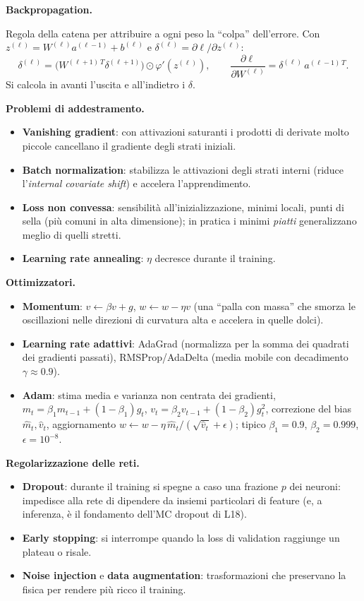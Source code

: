 \documentclass[11pt,a4paper]{article}
\newcommand{\dom}[1]{\par\smallskip\noindent\textbf{#1}\par\nopagebreak}
\begin{document}
\dom{Backpropagation.} Regola della catena per attribuire a ogni peso la ``colpa'' dell'errore. Con $z^{(\ell)}=W^{(\ell)}a^{(\ell-1)}+b^{(\ell)}$ e $\delta^{(\ell)}=\partial\ell/\partial z^{(\ell)}$:
\[
\delta^{(\ell)}=\big(W^{(\ell+1)\,T}\delta^{(\ell+1)}\big)\odot\varphi'(z^{(\ell)}),\qquad
\frac{\partial\ell}{\partial W^{(\ell)}}=\delta^{(\ell)}\,a^{(\ell-1)\,T}.
\]
Si calcola in avanti l'uscita e all'indietro i $\delta$.

\dom{Problemi di addestramento.}
\begin{itemize}
\item \textbf{Vanishing gradient}: con attivazioni saturanti i prodotti di derivate molto piccole cancellano il gradiente degli strati iniziali.
\item \textbf{Batch normalization}: stabilizza le attivazioni degli strati interni (riduce l'\emph{internal covariate shift}) e accelera l'apprendimento.
\item \textbf{Loss non convessa}: sensibilit\`a all'inizializzazione, minimi locali, punti di sella (pi\`u comuni in alta dimensione); in pratica i minimi \emph{piatti} generalizzano meglio di quelli stretti.
\item \textbf{Learning rate annealing}: $\eta$ decresce durante il training.
\end{itemize}

\dom{Ottimizzatori.}
\begin{itemize}
\item \textbf{Momentum}: $v\leftarrow\beta v+g$, $w\leftarrow w-\eta v$ (una ``palla con massa'' che smorza le oscillazioni nelle direzioni di curvatura alta e accelera in quelle dolci).
\item \textbf{Learning rate adattivi}: AdaGrad (normalizza per la somma dei quadrati dei gradienti passati), RMSProp/AdaDelta (media mobile con decadimento $\gamma\approx0.9$).
\item \textbf{Adam}: stima media e varianza non centrata dei gradienti,
 $m_t=\beta_1m_{t-1}+(1-\beta_1)g_t$, $v_t=\beta_2v_{t-1}+(1-\beta_2)g_t^2$, correzione del bias $\hat m_t,\hat v_t$, aggiornamento $w\leftarrow w-\eta\,\hat m_t/(\sqrt{\hat v_t}+\epsilon)$; tipico $\beta_1=0.9$, $\beta_2=0.999$, $\epsilon=10^{-8}$.
\end{itemize}

\dom{Regolarizzazione delle reti.}
\begin{itemize}
\item \textbf{Dropout}: durante il training si spegne a caso una frazione $p$ dei neuroni: impedisce alla rete di dipendere da insiemi particolari di feature (e, a inferenza, \`e il fondamento dell'MC dropout di L18).
\item \textbf{Early stopping}: si interrompe quando la loss di validation raggiunge un plateau o risale.
\item \textbf{Noise injection} e \textbf{data augmentation}: trasformazioni che preservano la fisica per rendere pi\`u ricco il training.
\end{itemize}
\end{document}
